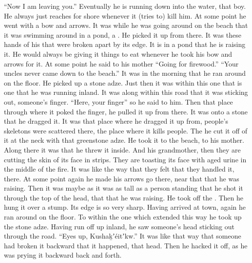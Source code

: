 \begin{pairs}
\begin{Rightside}
\qqk{}“Now I am leaving you.”
Eventually he is running down into the water, that boy.
He always just reaches for shore whenever it (tries to) kill him.
\pend
\pstart
{}At some point he went with a bow and arrows.
It was while he was going around on the beach that it was swimming around in a pond, a .
He picked it up from there.
It was these hands of his that were broken apart by its edge.
It is in a pond that he is raising it.
He would always be giving it things to eat whenever he took his bow and arrows for it.
\pend
\pstart
{}At some point he said to his mother
\qqk{}“Going for firewood.”
\qqk{}“Your uncles never came down to the beach.”
It was in the morning that he ran around on the floor.
He picked up a stone adze.
Just then it was within this one that is one that he was running inland.
It was along within this road that it was sticking out, someone’s finger.
\qqk{}“Here, your finger”
so he said to him.
Then that place through where it poked the finger, he pulled it up from there.
It was onto a stone that he dragged it.
It was that place where he dragged it up from, people’s skeletons were scattered there, the place where it kills people.
The he cut it off of it at the neck with that greenstone adze.
He took it to the beach, to his mother.
Along there it was that he threw it inside.
And his grandmother, then they are cutting the skin of its face in strips.
They are toasting its face with aged urine in the middle of the fire.
It was like the way that they felt that they handled it, there.
At some point again he made his arrows go there, near that  that he was raising.
Then it was maybe as it was as tall as a person standing that he shot it through the top of the head, that  that he was raising.
He took off the .
Then he hung it over a stump.
Its edge is so very sharp.
\pend
\pstart
{}Having arrived at town, again he ran around on the floor.
To within the one which extended this way he took up the stone adze.
Having run off up inland, he saw someone’s head sticking out through the road.
\qqk{}“Eyes up, Kushaḵʼéitʼkw.”
It was like that way that someone had broken it backward that it happened, that head.
Then he hacked it off, as he was prying it backward back and forth.

\end{Rightside}
\end{pairs}
